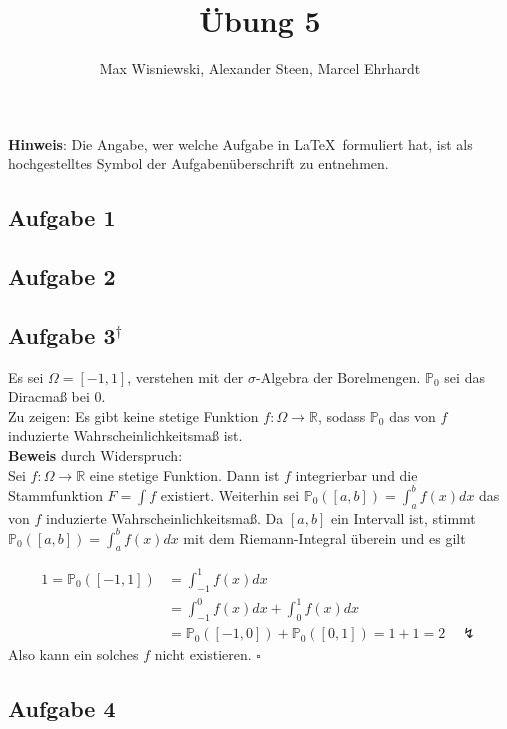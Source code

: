 \documentclass[11pt,a4paper,ngerman]{article}
\date{}
\title{Übung 5}
\author{Max Wisniewski\maxw, Alexander Steen\alex, Marcel Ehrhardt\marcel}
\newcommand{\Prob}{\mathbb{P}}
\newcommand{\alex}{$^\dagger$}
\begin{document}

\renewcommand{\figurename}{Figure}

\maketitle
\thispagestyle{fancy}

\begin{center}
\textbf{Hinweis}: Die Angabe, wer welche Aufgabe in \LaTeX\ formuliert hat, ist als hochgestelltes Symbol der Aufgabenüberschrift zu entnehmen.
\end{center}


\subsection*{Aufgabe 1}

\subsection*{Aufgabe 2}


\subsection*{Aufgabe 3\alex}
Es sei $\Omega = [-1,1]$, verstehen mit der $\sigma$-Algebra der Borelmengen. $\Prob_0$ sei das Diracmaß bei 0.\\
Zu zeigen: Es gibt keine stetige Funktion $f: \Omega \to  \mathbb{R}$, sodass $\Prob_0$ das von $f$ induzierte Wahrscheinlichkeitsmaß ist. \\

\textbf{Beweis} durch Widerspruch: \\
Sei $f: \Omega \to \mathbb{R}$ eine stetige Funktion. Dann ist $f$ integrierbar und die Stammfunktion $F = \int f$ existiert. Weiterhin sei $\Prob_0([a,b]) = \int_a^b f(x) dx$ das von $f$ induzierte Wahrscheinlichkeitsmaß. Da $[a,b]$ ein Intervall ist, stimmt $\Prob_0([a,b]) = \int_a^b f(x) dx$ mit dem Riemann-Integral überein und es gilt

\begin{equation*}\begin{split}
1 = \Prob_0([-1,1]) &= \int_{-1}^1 f(x) dx \\
  &=  \int_{-1}^0 f(x) dx +  \int_{0}^1 f(x) dx \\
  &= \Prob_0([-1,0]) +  \Prob_0([0,1]) = 1 + 1 = 2 \quad \lightning
\end{split}\end{equation*}
Also kann ein solches $f$ nicht existieren.
\mbox{} \hfill $\square$

\subsection*{Aufgabe 4}

\label{LastPage}
\end{document}
